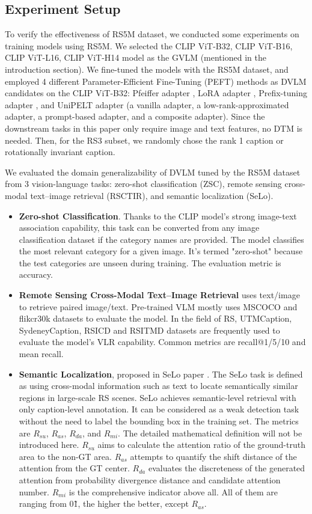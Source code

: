 \documentclass[journal]{IEEEtran}
\begin{document}
\subsection{Experiment Setup}
To verify the effectiveness of RS5M dataset, we conducted some experiments on training models using RS5M. We selected the CLIP ViT-B\/32, CLIP ViT-B\/16, CLIP ViT-L\/16, CLIP ViT-H\/14 model as the GVLM (mentioned in the introduction section). We fine-tuned the models with the RS5M dataset, and employed 4 different Parameter-Efficient Fine-Tuning (PEFT) methods as DVLM candidates on the CLIP ViT-B\/32: Pfeiffer adapter \cite{pfeiffer2021adapterfusion}, LoRA adapter \cite{hu2021lora}, Prefix-tuning adapter \cite{li2021prefixtuning}, and UniPELT adapter \cite{unipelt} (a vanilla adapter, a low-rank-approximated adapter, a prompt-based adapter, and a composite adapter). Since the downstream tasks in this paper only require image and text features, no DTM is needed. Then, for the RS3 subset, we randomly chose the rank 1 caption or rotationally invariant caption. 

We evaluated the domain generalizability of DVLM tuned by the RS5M dataset from 3 vision-language tasks: zero-shot classification (ZSC), remote sensing cross-modal text–image retrieval (RSCTIR), and semantic localization (SeLo). 

\begin{itemize}
    \item \textbf{Zero-shot Classification}. Thanks to the CLIP \cite{clip} model's strong image-text association capability, this task can be converted from any image classification dataset if the category names are provided. The model classifies the most relevant category for a given image. It's termed "zero-shot" because the test categories are unseen during training. The evaluation metric is accuracy.
    \item \textbf{Remote Sensing Cross-Modal Text–Image Retrieval} uses text/image to retrieve paired image/text. Pre-trained VLM mostly uses MSCOCO and flikcr30k datasets to evaluate the model. In the field of RS, UTMCaption, SydeneyCaption, RSICD and RSITMD datasets are frequently used to evaluate the model's VLR capability. Common metrics are recall@1/5/10 and mean recall.
     \item \textbf{Semantic Localization}, proposed in SeLo paper \cite{selo}. The SeLo task is defined as using cross-modal information such as text to locate semantically similar regions in large-scale RS scenes. SeLo achieves semantic-level retrieval with only caption-level annotation. It can be considered as a weak detection task without the need to label the bounding box in the training set. The metrics are $R_{su}$, $R_{as}$, $R_{da}$, and $R_{mi}$. The detailed mathematical definition will not be introduced here. $R_{su}$ aims to calculate the attention ratio of the ground-truth area to the non-GT area. $R_{as}$ attempts to quantify the shift distance of the attention from the GT center. $R_{da}$ evaluates the discreteness of the generated attention from probability divergence distance and candidate attention number. $R_{mi}$ is the comprehensive indicator above all. All of them are ranging from 0\~1, the higher the better, except $R_{as}$.
\end{itemize}
\end{document}
